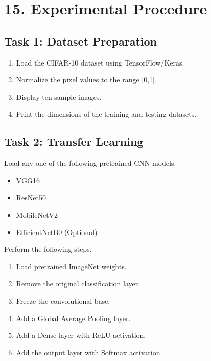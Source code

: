 \documentclass[11pt]{article}
\begin{document}

\section*{15. Experimental Procedure}

\subsection*{Task 1: Dataset Preparation}

\begin{enumerate}

\item Load the CIFAR-10 dataset using TensorFlow/Keras.

\item Normalize the pixel values to the range [0,1].

\item Display ten sample images.

\item Print the dimensions of the training and testing datasets.

\end{enumerate}


\subsection*{Task 2: Transfer Learning}

Load any one of the following pretrained CNN models.

\begin{itemize}

\item VGG16

\item ResNet50

\item MobileNetV2

\item EfficientNetB0 (Optional)

\end{itemize}

Perform the following steps.

\begin{enumerate}

\item Load pretrained ImageNet weights.

\item Remove the original classification layer.

\item Freeze the convolutional base.

\item Add a Global Average Pooling layer.

\item Add a Dense layer with ReLU activation.

\item Add the output layer with Softmax activation.

\end{enumerate}
\end{document}

